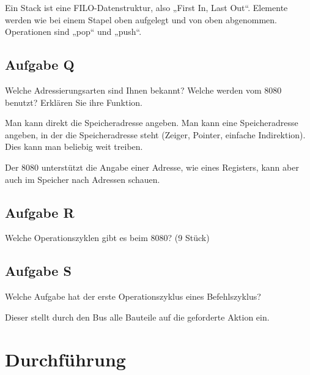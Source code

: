 Ein Stack ist eine FILO-Datenstruktur, also „First In, Last Out“. Elemente
werden wie bei einem Stapel oben aufgelegt und von oben abgenommen. Operationen
sind „pop“ und „push“.

\subsection{Aufgabe Q}

\begin{problem}
	Welche Adressierungsarten sind Ihnen bekannt? Welche werden vom 8080
	benutzt? Erklären Sie ihre Funktion.
\end{problem}

Man kann direkt die Speicheradresse angeben. Man kann eine Speicheradresse
angeben, in der die Speicheradresse steht (Zeiger, Pointer, einfache
Indirektion). Dies kann man beliebig weit treiben.

Der 8080 unterstützt die Angabe einer Adresse, wie eines Registers, kann aber
auch im Speicher nach Adressen schauen.

\subsection{Aufgabe R}

\begin{problem}
	Welche Operationszyklen gibt es beim 8080? (9 Stück)
\end{problem}

\fehlt

\subsection{Aufgabe S}

\begin{problem}
	Welche Aufgabe hat der erste Operationszyklus eines Befehlszyklus?
\end{problem}

Dieser stellt durch den Bus alle Bauteile auf die geforderte Aktion ein.


\section{Durchführung}

